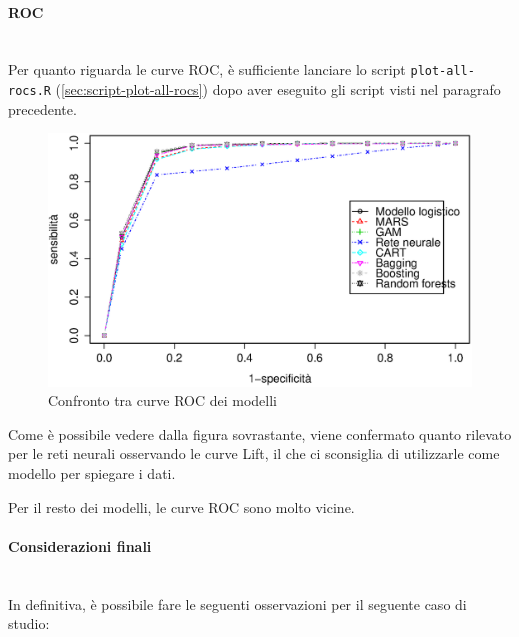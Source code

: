 \paragraph{ROC} \mbox{} \\

Per quanto riguarda le curve ROC, è sufficiente lanciare lo script
\texttt{plot-all-rocs.R} (\ref{sec:script-plot-all-rocs}) dopo aver eseguito
gli script visti nel paragrafo precedente.

\begin{figure}[H]
  \centering
  \includegraphics[width=.5\columnwidth]{images/class/all-rocs.eps}
  \caption{Confronto tra curve ROC dei modelli}
  \label{fig:all-lifts}
\end{figure}

Come è possibile vedere dalla figura sovrastante, viene confermato quanto
rilevato per le reti neurali osservando le curve Lift, il che ci sconsiglia di
utilizzarle come modello per spiegare i dati.

Per il resto dei modelli, le curve ROC sono molto vicine.

\paragraph{Considerazioni finali} \mbox{} \\

In definitiva, è possibile fare le seguenti osservazioni per il seguente caso
di studio:

